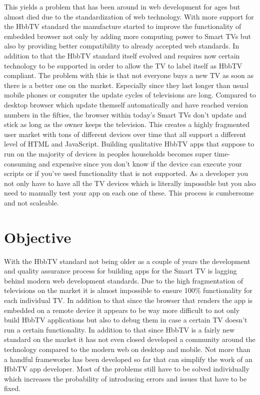 This yields a problem that has been around in web development for ages but almost died due to the standardization
of web technology. With more support for the HbbTV standard the manufacture started to improve the functionality
of embedded browser not only by adding more computing power to Smart TVs but also by providing better compatibility
to already accepted web standards. In addition to that the HbbTV standard itself evolved and requires now certain
technology to be supported in order to allow the TV to label itself as HbbTV compliant. The problem with this is
that not everyone buys a new TV as soon as there is a better one on the market. Especially since they last longer
than usual mobile phones or computer the update cycles of televisions are long. Compared to desktop browser which
update themself automatically and have reached version numbers in the fifties, the browser within today's Smart
TVs don't update and stick as long as the owner keeps the television. This creates a highly fragmented
user market with tons of different devices over time that all support a different level of HTML and JavaScript.
Building qualitative HbbTV apps that suppose to run on the majority of devices in peoples households becomes super
time-consuming and expensive since you don't know if the device can execute your scripts or if you've used
functionality that is not supported. As a developer you not only have to have all the TV devices which is literally
impossible but you also need to manually test your app on each one of these. This process is cumbersome and not
scaleable.

\section{Objective\label{sec:objective}}

With the HbbTV standard not being older as a couple of years the development and quality assurance process for
building apps for the Smart TV is lagging behind modern web development standards. Due to the high fragmentation
of televisions on the market it is almost impossible to ensure 100\% functionality for each individual TV.
In addition to that since the browser that renders the app is embedded on a remote device it appears to be
way more difficult to not only build HbbTV applications but also to debug them in case a certain TV doesn't
run a certain functionality. In addition to that since HbbTV is a fairly new standard on the market it has not
even closed developed a community around the technology compared to the modern web on desktop and mobile. Not
more than a handful frameworks has been developed so far that can simplify the work of an HbbTV app developer. Most
of the problems still have to be solved individually which increases the probability of introducing errors and
issues that have to be fixed.

